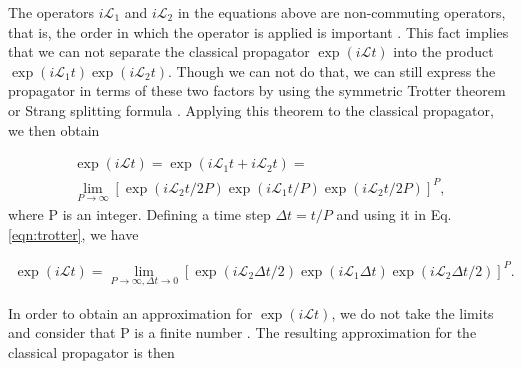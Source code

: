 \documentclass[
	12pt,				%
	openany,			%
	oneside,			%
	a4paper,			%
	english,			%
	brazil				%
	]{abntex2}
\begin{document}
The operators $i\mathcal{L}_{1}$ and $i\mathcal{L}_{2}$ in the equations above are non-commuting operators, that is, the order in which the operator is applied is important \cite{tuckerman}. This fact implies that we can not separate the classical propagator $\exp (i\mathcal{L}t)$  into the product $\exp (i\mathcal{L}_{1}t) \exp (i\mathcal{L}_{2}t)$. Though we can not do that, we can still express the propagator in terms of these two factors by using the symmetric Trotter theorem or Strang splitting formula \cite{trotter,strang}. Applying this theorem to the classical propagator, we then obtain

\begin{equation}
\begin{aligned}
\exp (i\mathcal{L}t)  = \exp (i\mathcal{L}_{1}t + i\mathcal{L}_{2}t) = \\
\lim\limits_{P \rightarrow \infty} \left [ \exp (i\mathcal{L}_{2}t/2P) \exp (i\mathcal{L}_{1}t/P) \exp (i\mathcal{L}_{2}t/2P) \right ]^{P},
\end{aligned}
\label{eqn:trotter}
\end{equation}
where P is an integer. Defining a time step $\Delta t =t/P$ and using it in Eq. \ref{eqn:trotter}, we have

\begin{equation}
\begin{aligned}
\exp (i\mathcal{L}t)  = 
\lim\limits_{P \rightarrow \infty, \Delta t \rightarrow 0} \left [ \exp (i\mathcal{L}_{2} \Delta t/2) \exp (i\mathcal{L}_{1} \Delta t) \exp (i\mathcal{L}_{2} \Delta t/2) \right ]^{P}.
\end{aligned}
\label{eqn:trotterdt}
\end{equation}

In order to obtain an approximation for $\exp (i\mathcal{L}t)$, we do not take the limits and consider that P is a finite number \cite{tuckerman}. The resulting approximation for the classical propagator is then 
\end{document}

